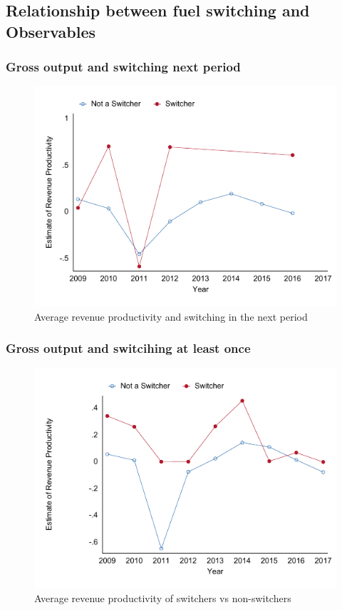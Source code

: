 \documentclass[12pt,notitlepage]{article}
\begin{document}
\subsection{Relationship between fuel switching and Observables}

\subsubsection{Gross output and switching next period}
\centering


\begin{figure}[!htpb]
\centering
\caption{Average revenue productivity and switching in the next period}
 \includegraphics{../Output/Graphs/RevProdSwitchingNextPeriod_year.pdf}
\end{figure}
\pagebreak

\subsubsection{Gross output and switcihing at least once}
\centering


\begin{figure}[!htpb]
\centering
\caption{Average revenue productivity of switchers vs non-switchers}
 \includegraphics{../Output/Graphs/RevProdSwitching_year.pdf}
\end{figure}
\pagebreak
\end{document}

